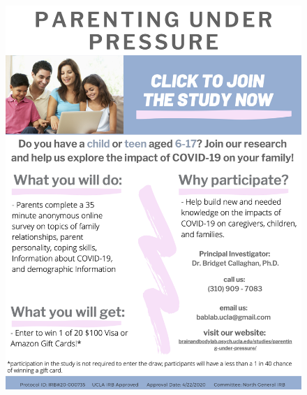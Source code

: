 \documentclass[]{book}
\begin{document}
\begin{figure}
\centering
\includegraphics{images/PUP_2_flyer.png}
\caption{}
\end{figure}
\end{document}
